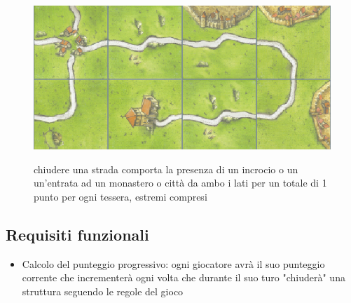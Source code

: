 \begin{figure}[]
    {\includegraphics[]{images/Strada.png}}

    \caption{chiudere una strada comporta la presenza di un incrocio o un un’entrata ad un monastero o città da ambo i lati per un totale di 1 punto per ogni tessera, estremi compresi}
\end{figure}

\subsection{Requisiti funzionali}

\begin{itemize}
\item Calcolo del punteggio progressivo: ogni giocatore avrà il suo punteggio corrente che incrementerà ogni volta che durante il suo turo "chiuderà" una struttura seguendo le regole del gioco
\end{itemize}

